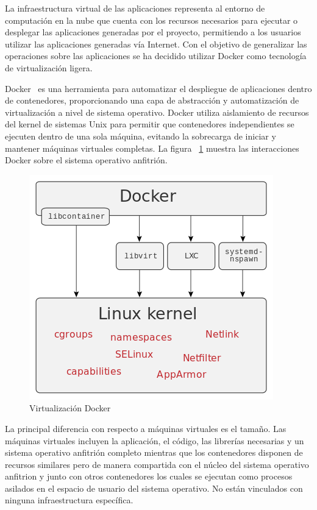 \documentclass[a4paper,11pt]{book}
\begin{document}
La infraestructura virtual de las aplicaciones  representa al entorno de computación en la nube que cuenta con los recursos necesarios para ejecutar o desplegar las aplicaciones generadas por el proyecto, permitiendo a los usuarios utilizar las aplicaciones generadas vía Internet.
Con el objetivo de generalizar las operaciones sobre las aplicaciones  se ha decidido utilizar Docker como tecnología de virtualización ligera.

Docker~\cite{dk} es una herramienta para automatizar el despliegue de aplicaciones dentro de contenedores, proporcionando una capa de abstracción y automatización de virtualización a nivel de sistema operativo. Docker utiliza aislamiento de recursos del kernel de sistemas Unix  para permitir que contenedores independientes se ejecuten dentro de una sola máquina, evitando la sobrecarga de iniciar y mantener máquinas virtuales completas. La figura ~\ref{d} muestra las interacciones Docker sobre el sistema operativo anfitrión. 

\begin{figure}[H]
\centering
\includegraphics[scale=0.35]{imagenes/docker.png}
\caption{ Virtualización Docker~\cite{dkw}}
\label{d}
\end{figure}

La principal diferencia con respecto a máquinas virtuales es el tamaño. Las máquinas virtuales incluyen la aplicación, el código, las librerías necesarias y un sistema operativo anfitrión completo mientras que los contenedores disponen de recursos similares pero de manera compartida con el núcleo  del sistema operativo anfitrion y junto con otros contenedores los cuales se ejecutan  como procesos asilados en el espacio de usuario del sistema operativo. No están vinculados con ninguna infraestructura específica.
\end{document}
